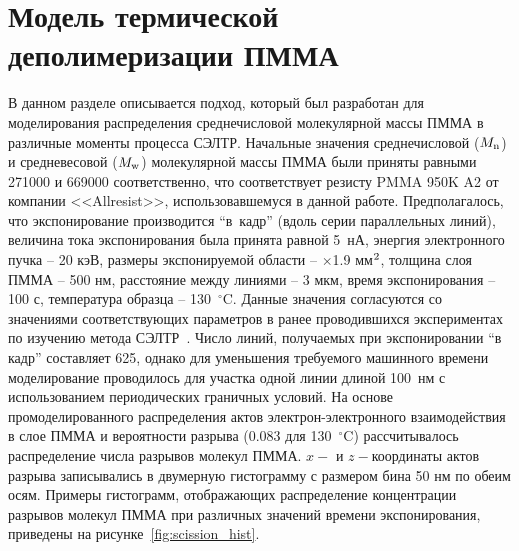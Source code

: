 \section{Модель термической деполимеризации ПММА} \label{sec:depolymerization}

В данном разделе описывается подход, который был разработан для моделирования распределения среднечисловой молекулярной массы \linebreak ПММА в различные моменты процесса СЭЛТР.
Начальные значения среднечисловой ($M_\mathrm{n}$) и средневесовой ($M_\mathrm{w}$) молекулярной массы ПММА были приняты равными 271000 и 669000 соответственно, что соответствует резисту PMMA 950K A2 от компании <<Allresist>>, использовавшемуся в данной работе.
Предполагалось, что экспонирование производится ``в~кадр'' (вдоль серии параллельных линий), величина тока экспонирования была принята равной 5~нА, энергия электронного пучка -- 20 кэВ, размеры экспонируемой области -- $\times$1.9 мм$^\text{2}$, толщина слоя ПММА -- 500 нм, расстояние между линиями -- 3 мкм, время экспонирования -- 100 с, температура образца -- 130~$^\circ$C.
Данные значения согласуются со значениями соответствующих параметров в ранее проводившихся экспериментах по изучению метода СЭЛТР~\cite{Bruk_2016_mee}.
Число линий, получаемых при экспонировании ``в кадр'' составляет 625, однако для уменьшения требуемого машинного времени моделирование проводилось для участка одной линии длиной 100~нм с использованием периодических граничных условий.
На основе промоделированного распределения актов электрон-электронного взаимодействия в слое ПММА и вероятности разрыва (0.083 для 130~$^\circ$C) рассчитывалось распределение числа разрывов молекул ПММА.
$x-$ и $z-$координаты актов разрыва записывались в двумерную гистограмму с размером бина 50 нм по обеим осям.
Примеры гистограмм, отображающих распределение концентрации разрывов молекул ПММА при различных значений времени экспонирования, приведены на рисунке~\ref{fig:scission_hist}.

